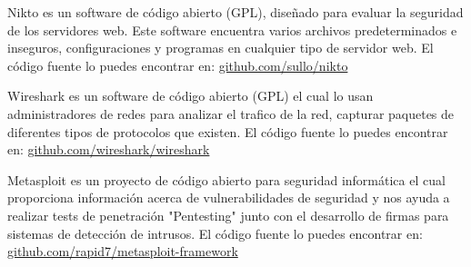 \begin{multicols}{2}
Nikto es un software de código abierto (GPL), diseñado para evaluar la seguridad de los servidores web. Este software encuentra varios archivos predeterminados e inseguros, configuraciones y programas en cualquier tipo de servidor web. 
El código fuente lo puedes encontrar en: \href{https://github.com/sullo/nikto}{github.com/sullo/nikto}


Wireshark es un software de código abierto (GPL) el cual lo usan administradores de redes para analizar el trafico de la red, capturar paquetes de diferentes tipos de protocolos que existen. El código fuente lo puedes encontrar en: \href{https://github.com/wireshark/wireshark}{github.com/wireshark/wireshark}


Metasploit es un proyecto de código abierto para seguridad informática el cual proporciona información acerca de vulnerabilidades de seguridad y nos ayuda a realizar tests de penetración "Pentesting" junto con el desarrollo de firmas para sistemas de detección de intrusos. El código fuente lo puedes encontrar en:  \href{https://github.com/rapid7/metasploit-framework}{github.com/rapid7/metasploit-framework}


\medskip


\end{multicols}
